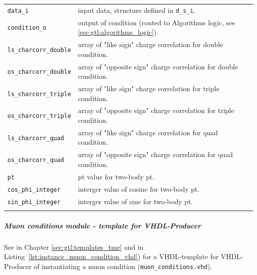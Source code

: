\begin{longtable}{>{\footnotesize}l >{\footnotesize}p{}}
\verb|data_i| & input data, structure defined in \texttt{d\_s\_i}.\\
\verb|condition_o| & output of condition (routed to Algorithms logic, see \ref{sec:gtl:algorithms_logic}).\\
\verb|ls_charcorr_double| & array of "like sign" charge correlation for double condition.\\
\verb|os_charcorr_double| & array of "opposite sign" charge correlation for double condition.\\
\verb|ls_charcorr_triple| & array of "like sign" charge correlation for triple condition.\\
\verb|os_charcorr_triple| & array of "opposite sign" charge correlation for triple condition.\\
\verb|ls_charcorr_quad| & array of "like sign" charge correlation for quad condition.\\
\verb|os_charcorr_quad| & array of "opposite sign" charge correlation for quad condition.\\
\verb|pt| & pt value for two-body pt.\\
\verb|cos_phi_integer| & interger value of cosine for two-body pt.\\
\verb|sin_phi_integer| & interger value of sine for two-body pt.\\
\hline 
\label{tab:gtl:explanation_muon_conditions_vhd}
\end{longtable}

\clearpage

\subparagraph{Muon conditions module - template for VHDL-Producer}
See in Chapter \ref{sec:gtl:templates_tme} and in Listing~\ref{lst:instance_muon_condition_vhd}) for a VHDL-template for VHDL-Producer of
instantiating a muon condition (\texttt{muon\_conditions.vhd}).\\

